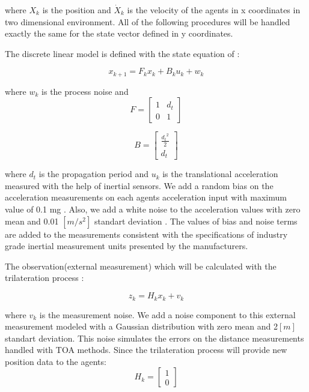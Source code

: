where $X_k$ is the position and $\dot{X}_k$ is the velocity of the agents in x coordinates in two dimensional environment. All of the following procedures will be handled exactly the same for the state vector defined in y coordinates.

The discrete linear model is defined with the state equation of \cite{wiki_kalman}:

\begin{equation}
x_{k+1} = F_k     x_{k} + B_ku_k + w_k
\end{equation}
	
where $w_k$ is the process noise and 
\begin{equation}
F = \begin{bmatrix}
1 & d_t\\
0 & 1
\end{bmatrix}   
\end{equation}
	
\begin{equation}
B = \begin{bmatrix}
\frac{{d_t}^2}{2} \\
d_t
\end{bmatrix}
\end{equation}

where $d_t$ is the propagation period and $u_k$ is the translational acceleration measured with the help of inertial sensors. We add a random bias on the acceleration measurements on each agents acceleration input with maximum value of 0.1 mg \cite{bias}. Also, we add a white noise to the acceleration values with zero mean and 0.01 $[m/s^2]$ standart deviation \cite{noise}. The values of bias and noise terms are added to the measurements consistent with the specifications of industry grade inertial measurement units presented by the manufacturers.

The observation(external measurement) which will be calculated with the trilateration process :

\begin{equation}
z_k = H_kx_k + v_k
\end{equation}

where $v_k$ is the measurement noise. We add a noise component to this external measurement modeled with a Gaussian distribution with zero mean and 2$[m]$ standart deviation. This noise simulates the errors on the distance measurements handled with TOA methods. Since the trilateration process will provide new position data to the agents:
\begin{equation}
H_k = \begin{bmatrix}
1\\0
\end{bmatrix}
\end{equation}
	
